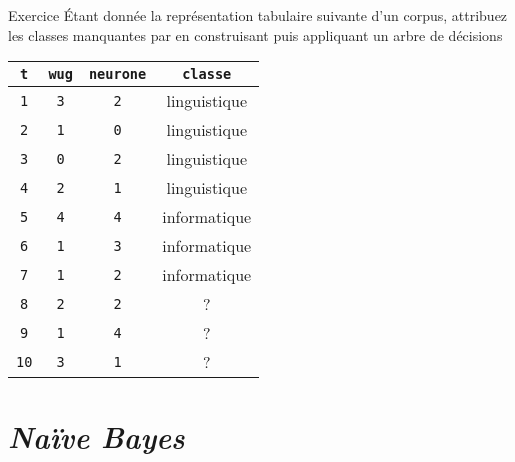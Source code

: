\documentclass[hyperref={unicode}, xcolor={svgnames}, french]{beamer}
\title{\titlepagetitle}
\subtitle{\titlepagesubtitle}
\author{\textbf{\myname} (\mylab)}
\institute{}
\date{\tiny Version {\yyyymmdddate\today}T\currenttime}
\begin{document}

\begin{frame}[plain]
	\titlepage
\end{frame}

\begin{frame}[fragile=singleslide]{Exercice}
	Étant donnée la représentation tabulaire suivante d'un corpus, attribuez les classes manquantes par en construisant puis appliquant un arbre de décisions
	\begin{table}
		\begin{tabu} to .9
			\texttt{t}  & \texttt{wug} & \texttt{neurone} & \texttt{classe}\\
			\hline
			\texttt{1}  & \texttt{3}      & \texttt{2}	& linguistique\\
			\texttt{2}  & \texttt{1}      & \texttt{0}	& linguistique\\
			\texttt{3}  & \texttt{0}      & \texttt{2}	& linguistique\\
			\texttt{4}  & \texttt{2}      & \texttt{1}	& linguistique\\
			\texttt{5}  & \texttt{4}      & \texttt{4}	& informatique\\
			\texttt{6}  & \texttt{1}      & \texttt{3}	& informatique\\
			\texttt{7}  & \texttt{1}      & \texttt{2}	& informatique\\
			\texttt{8}  & \texttt{2}      & \texttt{2}	& ?\\
			\texttt{9}  & \texttt{1}      & \texttt{4}	& ?\\
			\texttt{10}  & \texttt{3}      & \texttt{1}	& ?\\
		\end{tabu}
	\end{table}
\end{frame}

%

\section{\emph{Naïve Bayes}}
\end{document}
